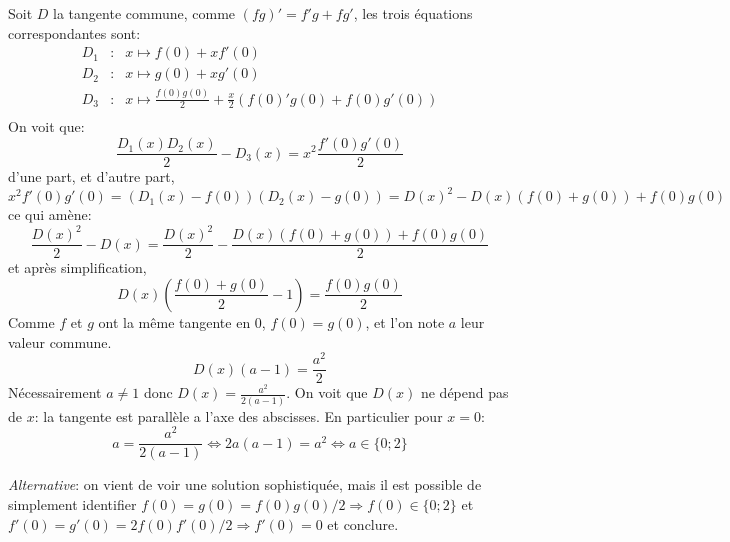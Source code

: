 Soit $D$ la tangente commune, comme $(fg)'=f'g+fg'$, les trois équations correspondantes sont:
\begin{eqnarray*}
  D_1 &:& x \mapsto f(0)+xf'(0) \\
  D_2 &:& x \mapsto g(0)+xg'(0) \\
  D_3 &:& x \mapsto \frac{f(0)g(0)}{2}+\frac{x}{2}(f(0)'g(0)+f(0)g'(0)) \\
\end{eqnarray*}
On voit que:
\[
\frac{D_1(x)D_2(x)}{2} - D_3(x)  = x^2\frac{f'(0)g'(0)}{2}
\]
d'une part, et d'autre part, 
\[
x^2f'(0)g'(0)=(D_1(x)-f(0))(D_2(x)-g(0)) = D(x)^2-D(x)(f(0)+g(0))+f(0)g(0)
\]
ce qui amène:
\[
\frac{D(x)^2}{2}-D(x)=\frac{D(x)^2}{2}-\frac{D(x)(f(0)+g(0))+f(0)g(0)}{2}
\]
et après simplification,
\[
D(x)\left( \frac{f(0)+g(0)}{2}-1 \right) = \frac{f(0)g(0)}{2}
\]
Comme $f$ et $g$ ont la même tangente en 0, $f(0)=g(0)$, et l'on note $a$ leur valeur commune.
\[
D(x)(a-1)=\frac{a^2}{2}
\]
Nécessairement $a\neq 1$ donc $D(x)=\frac{a^2}{2(a-1)}$. On voit que $D(x)$ ne dépend pas de $x$: la tangente est parallèle a l'axe des abscisses. En particulier pour $x=0$:
\[
a = \frac{a^2}{2(a-1)} \Leftrightarrow 2a(a-1)=a^2 \Leftrightarrow a \in \lbrace 0; 2 \rbrace
\]

\textit{Alternative}: on vient de voir une solution sophistiquée, mais il est possible de simplement identifier $f(0)=g(0)=f(0)g(0)/2 \Rightarrow f(0) \in \lbrace 0; 2 \rbrace$ et $f'(0)=g'(0) = 2f(0)f'(0)/2 \Rightarrow f'(0)=0$ et conclure.
